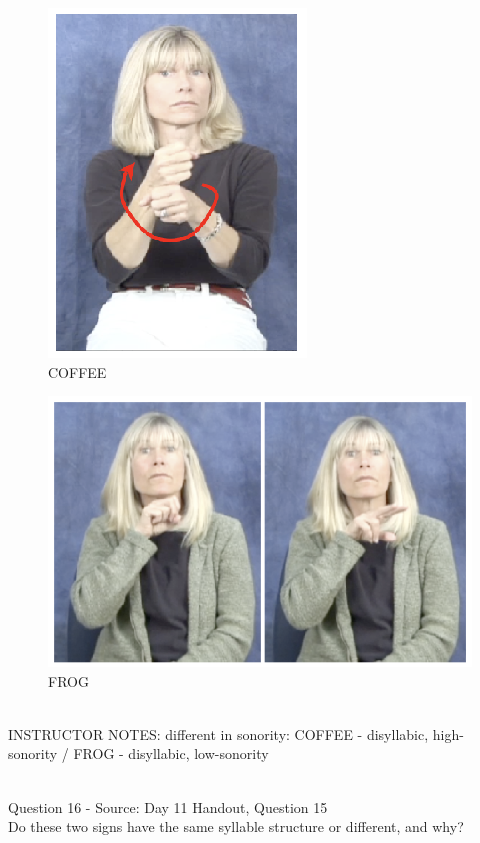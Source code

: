 \documentclass[12pt]{article}
\begin{document}
\begin{figure}[H]
\includegraphics{../images/asl_coffee.png}
\caption{COFFEE}
\end{figure}
\begin{figure}[H]
\includegraphics{../images/asl_frog.png}
\caption{FROG}
\end{figure}

~\\
INSTRUCTOR NOTES: different in sonority: COFFEE - disyllabic, high-sonority / FROG - disyllabic, low-sonority


~\\

{\large Question 16} - Source: Day 11 Handout, Question 15\\

Do these two signs have the same syllable structure or different, and why?\\
\end{document}
